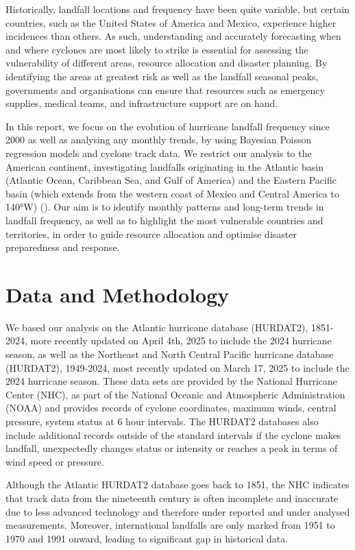 \documentclass[
]{article}
\begin{document}
Historically, landfall locations and frequency have been quite variable, but certain countries, such as the United States of America and Mexico, experience higher incidences than others. As such, understanding and accurately forecasting when and where cyclones are most likely to strike is essential for assessing the vulnerability of different areas, resource allocation and disaster planning. By identifying the areas at greatest risk as well as the landfall seasonal peaks, governments and organisations can ensure that resources such as emergency supplies, medical teams, and infrastructure support are on hand.

In this report, we focus on the evolution of hurricane landfall frequency since 2000 as well as analysing any monthly trends, by using Bayesian Poisson regression models and cyclone track data. We restrict our analysis to the American continent, investigating landfalls originating in the Atlantic basin (Atlantic Ocean, Caribbean Sea, and Gulf of America) and the Eastern Pacific basin (which extends from the western coast of Mexico and Central America to 140°W) (). Our aim is to identify monthly patterns and long-term trends in landfall frequency, as well as to highlight the most vulnerable countries and territories, in order to guide resource allocation and optimise disaster preparedness and response.

\section{Data and Methodology}\label{data-and-methodology}

We based our analysis on the Atlantic hurricane database (HURDAT2), 1851-2024, more recently updated on April 4th, 2025 to include the 2024 hurricane season, as well as the Northeast and North Central Pacific hurricane database (HURDAT2), 1949-2024, most recently updated on March 17, 2025 to include the 2024 hurricane season. These data sets are provided by the National Hurricane Center (NHC), as part of the National Oceanic and Atmospheric Administration (NOAA) and provides records of cyclone coordinates, maximum winds, central pressure, system status at 6 hour intervals. The HURDAT2 databases also include additional records outside of the standard intervals if the cyclone makes landfall, unexpectedly changes status or intensity or reaches a peak in terms of wind speed or pressure.

Although the Atlantic HURDAT2 database goes back to 1851, the NHC indicates that track data from the nineteenth century is often incomplete and inaccurate due to less advanced technology and therefore under reported and under analysed measurements. Moreover, international landfalls are only marked from 1951 to 1970 and 1991 onward, leading to significant gap in historical data.
\end{document}
